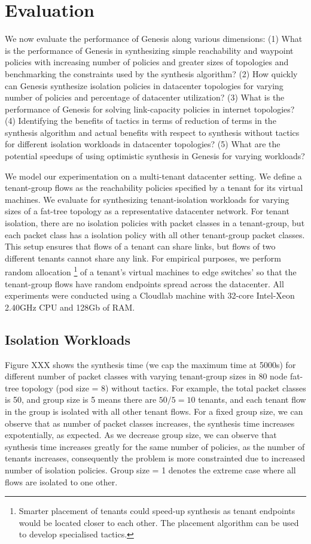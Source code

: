 \section{Evaluation}
We now evaluate the performance of Genesis along various dimensions:
 (1) What is the performance of Genesis in synthesizing simple reachability and waypoint policies
  with increasing number of policies and greater sizes of topologies and benchmarking the constraints used by the synthesis algorithm? 
  (2) How quickly can Genesis synthesize isolation policies in datacenter topologies for varying number of policies and percentage of
   datacenter utilization? 
   (3) What is the performance of Genesis for solving link-capacity policies in internet topologies? 
   (4) Identifying the benefits of tactics in terms of reduction of terms in the synthesis algorithm and actual benefits 
   with respect to synthesis without tactics for different isolation workloads in datacenter topologies? 
   (5) What are the potential speedups of using optimistic synthesis in Genesis for varying workloads? 

We model our experimentation on a multi-tenant datacenter setting. We 
define a tenant-group flows as the reachability policies specified by a tenant
for its virtual machines. We evaluate \Name for synthesizing tenant-isolation
workloads for varying sizes of a fat-tree 
topology as a representative datacenter network. For tenant isolation, there are
no isolation policies with packet classes in a tenant-group, but each packet class
has a isolation policy with all other tenant-group packet classes. This setup ensures
that flows of a tenant can share links, but flows of two different tenants cannot share
any link. 
For empirical purposes, 
we perform random allocation
\footnote{Smarter placement of tenants could speed-up synthesis as tenant endpoints would
	be located closer to each other. The placement algorithm can be used to develop specialised tactics.}
 of a tenant's virtual machines to edge switches'
so that the tenant-group flows have random endpoints spread across the datacenter. All 
experiments were conducted using a Cloudlab machine with 32-core Intel-Xeon 2.40GHz CPU and 128Gb of RAM. 
\subsection{Isolation Workloads}
Figure XXX shows the synthesis time (we cap the maximum time at 5000s) for different number of packet classes with varying tenant-group sizes in 80 node fat-tree topology (pod size = 8) without tactics. For example, the total packet classes is 50, and group size is 5 means there are $50/5 = 10$ tenants, and each tenant flow in the group is isolated with all other tenant flows. For a fixed group size, we can observe that as number of packet classes increases, the synthesis time increases expotentially, as expected. As we decrease group size, we can observe that synthesis time increases greatly for the same number of policies, as the number of tenants increases, consequently the problem is more constrainted due to increased number of isolation policies. Group size = 1 denotes the extreme case where all flows are isolated to one other. 

